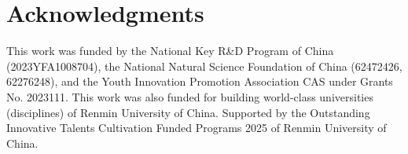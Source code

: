 \section*{Acknowledgments}
\label{sec:Acknowledgments}

This work was funded by the National Key R\&D Program of China (2023YFA1008704), the National Natural Science Foundation of China (62472426, 62276248), and the Youth Innovation Promotion Association CAS under Grants No. 2023111. This work was also funded for building world-class universities (disciplines) of Renmin University of China. Supported by the Outstanding Innovative Talents Cultivation Funded Programs 2025 of Renmin University of China.

